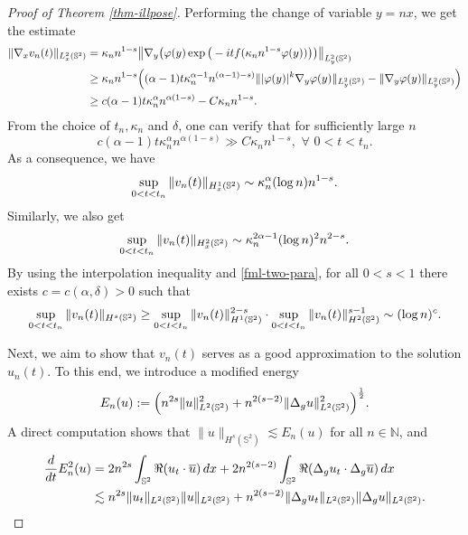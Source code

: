 \documentclass[10pt,a4paper]{amsart}
\numberwithin{equation}{section}
\begin{document}
\begin{proof}[Proof of Theorem \ref{thm-illpose}]
Performing the change of variable $y = nx$, we get the estimate  
\begin{align}\nonumber
\|\nabla_x v_n(t)\|_{L^2_x(\Bbb S^2)} &= \kappa_n n^{1-s} \big\|\nabla_y\big( \varphi(y)\exp\big( -itf(\kappa_n n^{1-s} \varphi(y)) \big) \big) \big\|_{L^2_y(\Bbb S^2)}\\\nonumber
&\ge \kappa_n n^{1-s} \Big( (\alpha-1) t \kappa_n^{\alpha-1} n^{(\alpha-1)-s)} \||\varphi(y)|^k\nabla_y \varphi(y)\|_{L^2_y(\Bbb S^2)} - \|\nabla_y \varphi(y)\|_{L^2_y(\Bbb S^2)} \Big)\\\label{fml-nabla-vn}
&\ge c(\alpha-1)t \kappa_n^{\alpha} n^{\alpha(1-s)} - C \kappa_n n^{1-s}.
\end{align}
{From the choice of $t_n,\kappa_n$ and $\delta$, one can verify that for sufficiently large $n$} 
\begin{equation*}
{c(\alpha-1)t \kappa_n^{\alpha} n^{\alpha(1-s)} \gg C \kappa_n n^{1-s},\,\, \forall \,\, 0<t<t_n.}
\end{equation*}
As a consequence, we have
\begin{equation*}
{\sup_{0<t<t_n}\|v_n(t)\|_{H^1_x(\Bbb S^2)} \sim \kappa_n^\alpha (\log n) n^{1-s}.}
\end{equation*}
Similarly, we also get
\begin{equation*}
{\sup_{0<t<t_n}\|v_n(t)\|_{H^2_x(\Bbb S^2)} \sim \kappa_n^{2\alpha-1} (\log n)^2 n^{2-s}.}
\end{equation*}
By using the interpolation inequality and \eqref{fml-two-para}, for all $0<s<1$ there exists $c=c(\alpha,\delta)>0$ such that
\begin{equation}\label{fml-vn-Hs}
\sup_{0<t<t_n}\|v_n(t)\|_{H^s(\Bbb S^2)} \ge \sup_{0<t<t_n}\|v_n(t)\|^{2-s}_{H^1(\Bbb S^2)}\cdot  \sup_{0<t<t_n}\|v_n(t)\|^{s-1}_{H^2(\Bbb S^2)} \sim (\log n)^c.
\end{equation}
		
Next, we aim to  show that $v_n(t)$ serves as a good approximation to the  solution $u_n(t)$. To this end, we introduce a modified energy   
\begin{equation*}
E_n(u) := \Big( n^{2s}\|u\|^2_{L^2(\Bbb S^2)} + n^{2(s-2)}\|\Delta_g u\|^2_{L^2(\Bbb S^2)} \Big)^{\frac{1}{2}}.
\end{equation*}
A direct computation shows that $\|u\|_{H^s(\mathbb{S}^2)} \lesssim E_n(u)$ for all $n \in \mathbb{N}$, and  
\begin{equation}\label{fml-deri-En}
\begin{aligned}
\frac{d}{dt} E^2_n(u) &= 2n^{2s} \int_{\Bbb S^2} \Re(u_t \cdot\overline{u})\, dx + 2n^{2(s-2)} \int_{\Bbb S^2} \Re(\Delta_g u_t \cdot\Delta_g\overline{u})\, dx\\
&\lesssim n^{2s} \|u_t\|_{L^2(\Bbb S^2)}\|u\|_{L^2(\Bbb S^2)} + n^{2(s-2)} \|\Delta_g u_t\|_{L^2(\Bbb S^2)}\|\Delta_g u\|_{L^2(\Bbb S^2)}.
\end{aligned}
\end{equation}
		

\end{proof}
\end{document}
